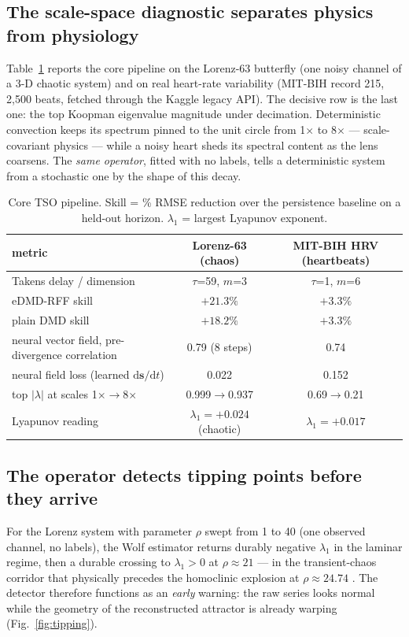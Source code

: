 \documentclass[11pt]{article}
\begin{document}
\subsection{The scale-space diagnostic separates physics from physiology}
\label{sec:scale}
Table~\ref{tab:core} reports the core pipeline on the Lorenz-63 butterfly
(one noisy channel of a 3-D chaotic system) and on real heart-rate
variability (MIT-BIH record 215, 2{,}500 beats, fetched through the Kaggle
legacy API). The decisive row is the last one: the top Koopman eigenvalue
magnitude under decimation. Deterministic convection keeps its spectrum
pinned to the unit circle from 1$\times$ to 8$\times$ --- scale-covariant
physics --- while a noisy heart sheds its spectral content as the lens
coarsens. The \emph{same operator}, fitted with no labels, tells a
deterministic system from a stochastic one by the shape of this decay.

\begin{table}[h]
\centering\small
\caption{Core TSO pipeline. Skill = \% RMSE reduction over the persistence
baseline on a held-out horizon. $\lambda_1$ = largest Lyapunov exponent.}
\label{tab:core}
\begin{tabular}{lcc}
\toprule
metric & Lorenz-63 (chaos) & MIT-BIH HRV (heartbeats) \\
\midrule
Takens delay / dimension & $\tau$=59, $m$=3 & $\tau$=1, $m$=6 \\
eDMD-RFF skill & $+21.3\%$ & $+3.3\%$ \\
plain DMD skill & $+18.2\%$ & $+3.3\%$ \\
neural vector field, pre-divergence correlation & 0.79 (8 steps) & 0.74 \\
neural field loss (learned $\mathrm{d}\mathbf{s}/\mathrm{d}t$) & 0.022 & 0.152 \\
top $|\lambda|$ at scales 1$\times\!\to\!$8$\times$
& 0.999$\to$0.937 & 0.69$\to$0.21 \\
Lyapunov reading & $\lambda_1=+0.024$ (chaotic) & $\lambda_1=+0.017$ \\
\bottomrule
\end{tabular}
\end{table}

\subsection{The operator detects tipping points before they arrive}
\label{sec:tipping}
For the Lorenz system with parameter $\rho$ swept from 1 to 40 (one observed
channel, no labels), the Wolf estimator returns durably negative
$\lambda_1$ in the laminar regime, then a durable crossing to
$\lambda_1>0$ at $\rho \approx 21$ --- in the transient-chaos corridor that
physically precedes the homoclinic explosion at $\rho\approx24.74$
\cite{lorenz1963}. The detector therefore functions as an \emph{early}
warning: the raw series looks normal while the geometry of the reconstructed
attractor is already warping (Fig.~\ref{fig:tipping}).
\end{document}

